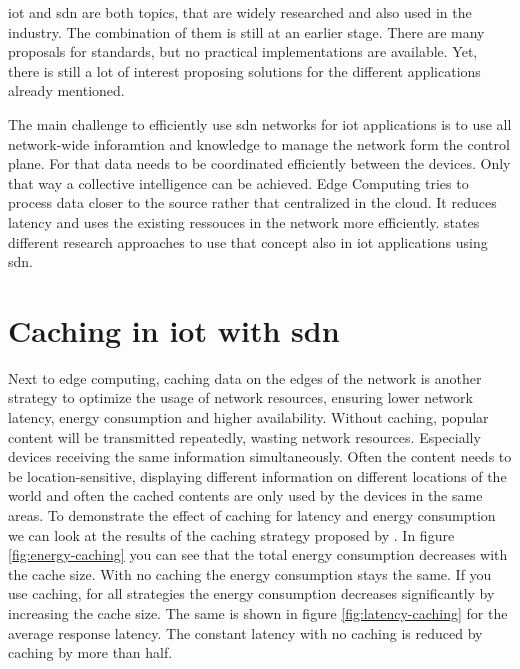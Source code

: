 \documentclass[conference]{IEEEtran}
\begin{document}
	\ac{iot} and \ac{sdn} are both topics, that are widely researched and also used in the industry. The combination of them is still at an earlier stage. There are many proposals for standards, but no practical implementations are available. Yet, there is still a lot of interest proposing solutions for the different applications already mentioned. \cite{Manguri2022-vp} 

	The main challenge to efficiently use \ac{sdn} networks for \ac{iot} applications is to use all network-wide inforamtion and knowledge to manage the network form the control plane. For that data needs to be coordinated efficiently between the devices. Only that way a collective intelligence can be achieved. Edge Computing tries to process data closer to the source rather that centralized in the cloud. It reduces latency and uses the existing ressouces in the network more efficiently. \cite{edge-computing} \citeauthor{Li2020-lx} states different research approaches to use that concept also in \ac{iot} applications using \ac{sdn}. 

	







	\section{Caching in \ac{iot} with \ac{sdn}}
	\label{sec:caching}

	Next to edge computing, caching data on the edges of the network is another strategy to optimize the usage of network resources, ensuring lower network latency, energy consumption and higher availability. \cite{caching-1} \cite{caching-2} \cite{caching-4} Without caching, popular content will be transmitted repeatedly, wasting network resources. Especially devices receiving the same information simultaneously. Often the content needs to be location-sensitive, displaying different information on different locations of the world and often the cached contents are only used by the devices in the same areas. To demonstrate the effect of caching  for latency and energy consumption we can look at the results of the caching strategy proposed by \cite{caching-1}. In figure \ref{fig:energy-caching} you can see that the total energy consumption decreases with the cache size. With no caching the energy consumption stays the same. If you use caching, for all strategies the energy consumption decreases significantly by increasing the cache size. The same is shown in figure \ref{fig:latency-caching} for the average response latency. The constant latency with no caching is reduced by caching by more than half.
\end{document}
